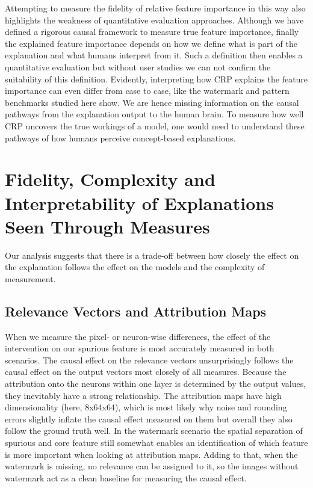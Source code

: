Attempting to measure the fidelity of relative feature importance in this way also highlights the weakness of quantitative evaluation approaches. 
Although we have defined a rigorous causal framework to 
measure true feature importance, finally the explained feature importance depends on how we define what is part of the explanation and what humans interpret from it. Such a definition then enables a quantitative evaluation but without user studies we can not confirm the suitability of this definition. Evidently, interpreting how CRP explains the feature importance can even differ from case to case, like the watermark and pattern benchmarks studied here show. 
We are hence missing information on the causal pathways from the explanation output to the human brain. To measure how well CRP uncovers the true workings of a model, one would need to understand these pathways of how humans perceive concept-based explanations.

\section{Fidelity, Complexity and Interpretability of Explanations Seen Through Measures}
Our analysis suggests that there is a trade-off between how closely the effect on the explanation follows the effect on the models and the complexity of measurement. 

\subsection{Relevance Vectors and Attribution Maps}
When we measure the pixel- or neuron-wise differences, the effect of the intervention on our spurious feature is most accurately measured in both scenarios. 
The causal effect on the relevance vectors unsurprisingly follows the causal effect on the output vectors most closely of all measures. Because the attribution onto the neurons within one layer is determined by the output values, they inevitably have a strong relationship. The attribution maps have high dimensionality (here, 8x64x64), which is most likely why noise and rounding errors slightly inflate the causal effect measured on them but overall they also follow the ground truth well.   
In the watermark scenario the spatial separation of spurious and core feature still somewhat enables an identification of which feature is more important when looking at attribution maps. Adding to that, when the watermark is missing, no relevance can be assigned to it, so the images without watermark act as a clean baseline for measuring the causal effect. 

